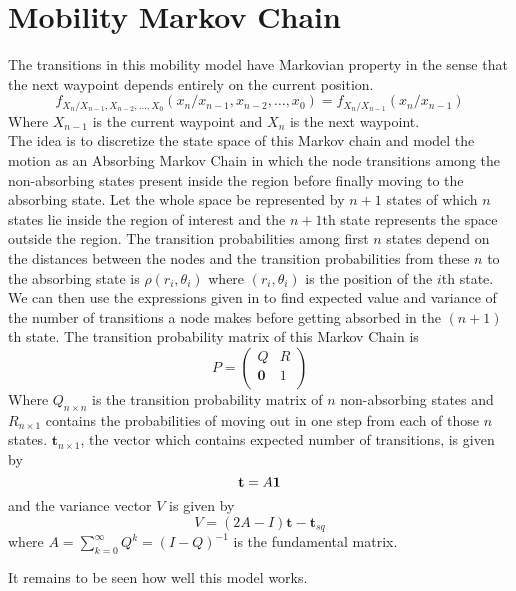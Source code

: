 \chapter{Mobility Markov Chain}
	The transitions in this mobility model have Markovian property in the sense that the next waypoint depends entirely on the current position. 
\begin{equation*}
	f_{X_n/X_{n-1},X_{n-2},\ldots,X_0}(x_n/x_{n-1},x_{n-2},\ldots,x_{0}) = f_{X_n/X_{n-1}}(x_n/x_{n-1})
\end{equation*}
Where $X_{n-1}$ is the current waypoint and $X_n$ is the next waypoint. \\
	The idea is to discretize the state space of this Markov chain and model the motion as an Absorbing Markov Chain in which the node transitions among the non-absorbing states present inside the region before finally moving to the absorbing state. 
Let the whole space be represented by $n+1$ states of which $n$ states lie inside the region of interest and the $n+1$th state represents the space outside the region. The transition probabilities among first $n$ states depend on the distances between the nodes and the transition probabilities from these $n$ to the absorbing state is $\rho(r_i,\theta_i)$ where $(r_i,\theta_i)$ is the position of the $i$th state. We can then use the expressions given in \cite{wiki:markovWiki}
to find expected value and variance of the number of transitions a node makes before getting absorbed in the $(n+1)$th state. The transition probability matrix of this Markov Chain is  
\begin{equation*}
	P  = \left(
	\begin{array}{cc}
	Q & R \\
		\mathbf{0} & 1 \\
	\end{array} \right)
\end{equation*}
	Where $Q_{n \times n}$ is the transition probability matrix of $n$ non-absorbing states and $R_{n\times1}$ contains the probabilities of moving out in one step from each of those $n$ states. 
	 $\mathbf{t}_{n \times 1}$, the vector which contains expected number of transitions, is given by
\begin{equation*}
	\mathbf{t} = A\mathbf{1} \\
\end{equation*}
and the variance vector $V$ is given by
\begin{equation*}
	 V = (2A-I)\mathbf{t} - \mathbf{t}_{sq}
\end{equation*}
where $A = \sum_{k=0}^{\infty} Q^k = (I-Q)^{-1}$ is the fundamental matrix.

	It remains to be seen how well this model works.
